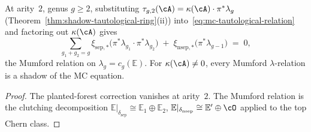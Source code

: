 \begin{proposition}
\label{prop:mumford-from-mc}
\ClaimStatusProvedHere
{}
At arity~$2$, genus $g \geq 2$, substituting
$\tau_{g,2}(\cA) = \kappa(\cA) \cdot \pi^*\lambda_g$
\textup{(}Theorem~\textup{\ref{thm:shadow-tautological-ring}(ii)}\textup{)}
into~\eqref{eq:mc-tautological-relation} and factoring out
$\kappa(\cA)$ gives
\begin{equation}\label{eq:mumford-from-mc}
\sum_{g_1+g_2=g}
\xi_{\mathrm{sep},*}\!
\bigl(\pi^*\lambda_{g_1} \cdot \pi^*\lambda_{g_2}\bigr)
\;+\;
\xi_{\mathrm{nsep},*}\!\bigl(\pi^*\lambda_{g-1}\bigr)
\;=\; 0,
\end{equation}
the Mumford relation on $\lambda_g = c_g(\mathbb{E})$.
For $\kappa(\cA) \neq 0$, every Mumford $\lambda$-relation
is a shadow of the MC equation.
\end{proposition}

\begin{proof}
The planted-forest correction vanishes at arity~$2$.
The Mumford relation is the clutching decomposition
$\mathbb{E}|_{\delta_{\mathrm{sep}}} \cong
\mathbb{E}_1 \oplus \mathbb{E}_2$,
$\mathbb{E}|_{\delta_{\mathrm{nsep}}} \cong
\mathbb{E}' \oplus \cO$ applied to the top Chern class.
\end{proof}

